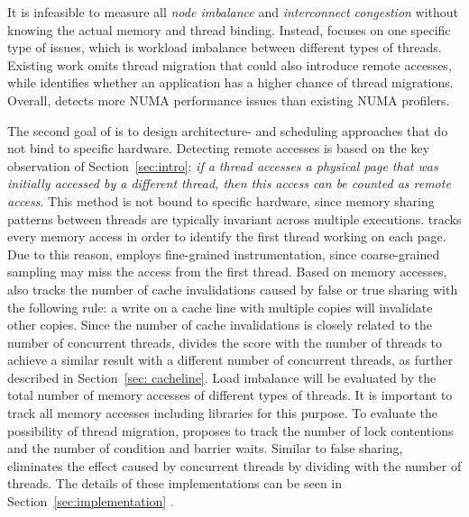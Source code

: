 It is infeasible to measure all \textit{node imbalance} and \textit{interconnect congestion} without knowing the actual memory and thread binding. Instead, \NP{} focuses on one specific type of issues, which is workload imbalance between different types of threads. 
Existing work omits thread migration that could also introduce remote accesses, while \NP{} identifies whether an application has a higher chance of thread migrations. 
Overall, \NP{} detects more NUMA performance issues than existing NUMA profilers. 


The second goal of \NP{} is to design architecture- and scheduling approaches that do not bind to  specific hardware. Detecting remote accesses is based on the key observation of Section~\ref{sec:intro}: \textit{if a thread accesses a physical page that was initially accessed by a different thread, then this access can be counted as remote access}. This method is not bound to specific hardware, since memory sharing patterns between threads are typically invariant across multiple executions. 
\NP{} tracks every memory access in order to identify the first thread working on each page. Due to this reason, \NP{} employs fine-grained instrumentation, since coarse-grained sampling may miss the access from the first thread. Based on memory accesses, \NP{} also tracks the number of cache invalidations caused by false or true sharing with the following rule: a write on a cache line with multiple copies will invalidate other copies. Since the number of cache invalidations is closely related to the number of concurrent threads, \NP{} divides the score with the number of threads to achieve a similar result with a different number of concurrent threads, as further described in Section~\ref{sec: cacheline}. Load imbalance will be evaluated by the total number of memory accesses of different types of threads. It is important to track all memory accesses including libraries for this purpose. To evaluate the possibility of thread migration, \NP{} proposes to track the number of lock contentions and the number of condition and barrier waits. Similar to false sharing, \NP{} eliminates the effect caused by concurrent threads by dividing with the number of threads. The details of these implementations can be seen in Section~\ref{sec:implementation} . 



